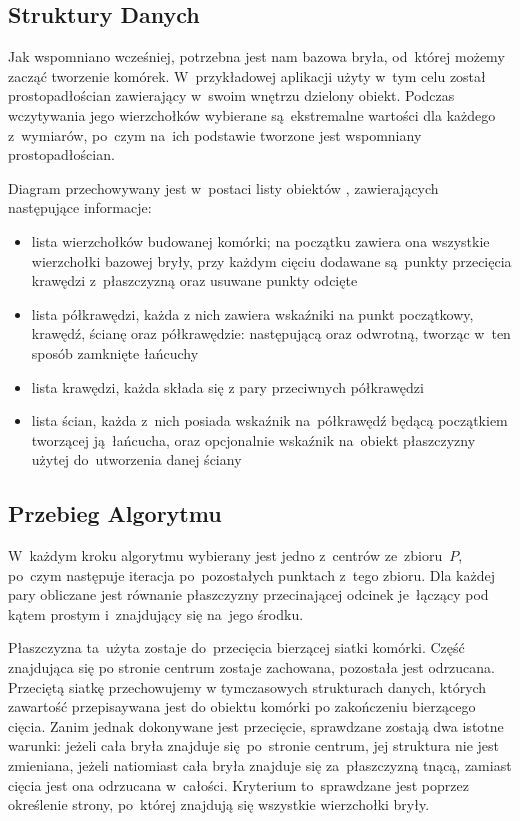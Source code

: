 \documentclass[skorowidz,autorrok,backref,xodstep,oswiadczenie]{wmimgr}
\begin{document}
\subsection{Struktury Danych}

Jak wspomniano wcześniej, potrzebna jest nam bazowa bryła, od~której możemy zacząć tworzenie komórek. W~przykładowej aplikacji użyty w~tym celu został prostopadłościan zawierający w~swoim wnętrzu dzielony obiekt. Podczas wczytywania jego wierzchołków wybierane są~ekstremalne wartości dla każdego z~wymiarów, po~czym na~ich podstawie tworzone jest wspomniany prostopadłościan.

Diagram przechowywany jest w~postaci listy obiektów , zawierających następujące informacje:
\begin{itemize}
\item
lista wierzchołków budowanej komórki; na początku zawiera ona wszystkie wierzchołki bazowej bryły, przy każdym cięciu dodawane są~punkty przecięcia krawędzi z~płaszczyzną oraz usuwane punkty odcięte
\item
lista półkrawędzi, każda z nich zawiera wskaźniki na punkt początkowy, krawędź, ścianę oraz półkrawędzie: następującą oraz odwrotną, tworząc w~ten sposób zamknięte łańcuchy
\item
lista krawędzi, każda składa się z pary przeciwnych półkrawędzi
\item
lista ścian, każda z~nich posiada wskaźnik na~półkrawędź będącą początkiem tworzącej ją~łańcucha, oraz opcjonalnie wskaźnik na~obiekt płaszczyzny użytej do~utworzenia danej ściany
\end{itemize}

\subsection{Przebieg Algorytmu}

W~każdym kroku algorytmu wybierany jest jedno z~centrów ze~zbioru~$P$, po~czym następuje iteracja po~pozostałych punktach z~tego zbioru. Dla każdej pary obliczane jest równanie płaszczyzny przecinającej odcinek je~łączący pod kątem prostym i~znajdujący się na~jego środku.

Płaszczyzna ta~użyta zostaje do~przecięcia bierzącej siatki komórki. Część znajdująca się po stronie centrum zostaje zachowana, pozostała jest odrzucana. Przeciętą siatkę przechowujemy w tymczasowych strukturach danych, których zawartość przepisaywana jest do obiektu komórki po zakończeniu bierzącego cięcia. Zanim jednak dokonywane jest przecięcie, sprawdzane zostają dwa istotne warunki: jeżeli cała bryła znajduje się~po~stronie centrum, jej struktura nie jest zmieniana, jeżeli natiomiast cała bryła znajduje się za~płaszczyzną tnącą, zamiast cięcia jest ona odrzucana w~całości. Kryterium to~sprawdzane jest poprzez określenie strony, po~której znajdują się wszystkie wierzchołki bryły.
\end{document}
